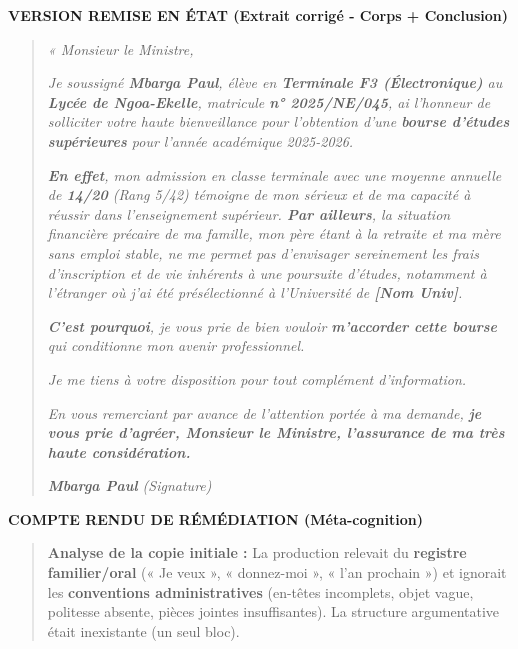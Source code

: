 \documentclass[11pt]{article}
\begin{document}
\begin{exoresolu}
\textbf{VERSION REMISE EN ÉTAT (Extrait corrigé - Corps + Conclusion)}

\begin{quote}
\emph{« Monsieur le Ministre,}

\emph{Je soussigné \textbf{Mbarga Paul}, élève en \textbf{Terminale F3 (Électronique)} au \textbf{Lycée de Ngoa-Ekelle}, matricule \textbf{n° 2025/NE/045}, ai l'honneur de solliciter votre haute bienveillance pour l'obtention d'une \textbf{bourse d'études supérieures} pour l'année académique 2025-2026.}

\emph{\textbf{En effet}, mon admission en classe terminale avec une moyenne annuelle de \textbf{14/20} (Rang 5/42) témoigne de mon sérieux et de ma capacité à réussir dans l'enseignement supérieur. \textbf{Par ailleurs}, la situation financière précaire de ma famille, mon père étant à la retraite et ma mère sans emploi stable, ne me permet pas d'envisager sereinement les frais d'inscription et de vie inhérents à une poursuite d'études, notamment à l'étranger où j'ai été présélectionné à l'Université de \textbf{[Nom Univ]}.}

\emph{\textbf{C'est pourquoi}, je vous prie de bien vouloir \textbf{m'accorder cette bourse} qui conditionne mon avenir professionnel.}

\emph{Je me tiens à votre disposition pour tout complément d'information.}

\emph{En vous remerciant par avance de l'attention portée à ma demande, \textbf{je vous prie d'agréer, Monsieur le Ministre, l'assurance de ma très haute considération.}}

\emph{\textbf{Mbarga Paul} \hfill \textit{(Signature)}}
\end{quote}

\textbf{COMPTE RENDU DE RÉMÉDIATION (Méta-cognition)}

\begin{quote}
\textbf{Analyse de la copie initiale :} La production relevait du \textbf{registre familier/oral} (« Je veux », « donnez-moi », « l'an prochain ») et ignorait les \textbf{conventions administratives} (en-têtes incomplets, objet vague, politesse absente, pièces jointes insuffisantes). La structure argumentative était inexistante (un seul bloc).


\end{quote}
\end{exoresolu}
\end{document}
